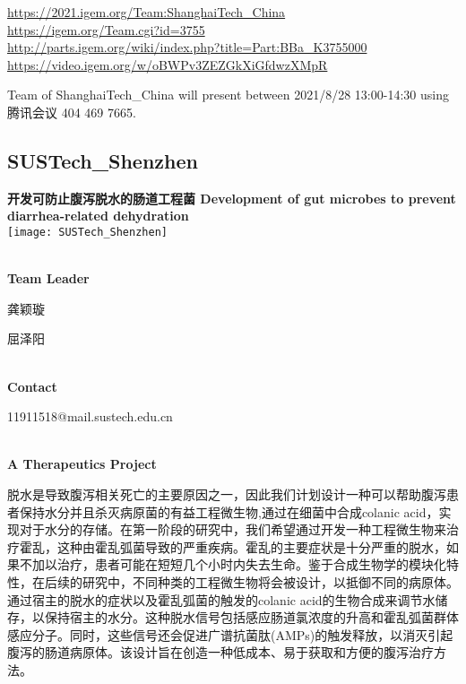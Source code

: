 \url{https://2021.igem.org/Team:ShanghaiTech\_China }\\
\url{https://igem.org/Team.cgi?id=3755 }\\
\url{http://parts.igem.org/wiki/index.php?title=Part:BBa_K3755000 }\\
\url{https://video.igem.org/w/oBWPv3ZEZGkXiGfdwzXMpR }\\

\vfill{}









Team of ShanghaiTech\_China will present between      2021/8/28 13:00-14:30   using 腾讯会议 404 469 7665.
\newpage


\subsection{\textcolor{Blu}{ SUSTech\_Shenzhen } }
\vspace{5mm}
\begin{center}
\large{
  \textbf{ 开发可防止腹泻脱水的肠道工程菌 Development of gut microbes to prevent diarrhea-related dehydration }\\
  \texttt{[image: SUSTech\_Shenzhen]}
}
\end{center}
\textbf{\\Team Leader}

  龚颖璇

  屈泽阳


\textbf{\\Contact}

  11911518@mail.sustech.edu.cn


\textbf{\\A Therapeutics Project\\}\begin{spacing}{1.5}

脱水是导致腹泻相关死亡的主要原因之一，因此我们计划设计一种可以帮助腹泻患者保持水分并且杀灭病原菌的有益工程微生物,通过在细菌中合成colanic acid，实现对于水分的存储。在第一阶段的研究中，我们希望通过开发一种工程微生物来治疗霍乱，这种由霍乱弧菌导致的严重疾病。霍乱的主要症状是十分严重的脱水，如果不加以治疗，患者可能在短短几个小时内失去生命。鉴于合成生物学的模块化特性，在后续的研究中，不同种类的工程微生物将会被设计，以抵御不同的病原体。通过宿主的脱水的症状以及霍乱弧菌的触发的colanic acid的生物合成来调节水储存，以保持宿主的水分。这种脱水信号包括感应肠道氯浓度的升高和霍乱弧菌群体感应分子。同时，这些信号还会促进广谱抗菌肽(AMPs)的触发释放，以消灭引起腹泻的肠道病原体。该设计旨在创造一种低成本、易于获取和方便的腹泻治疗方法。\end{spacing}
\\

